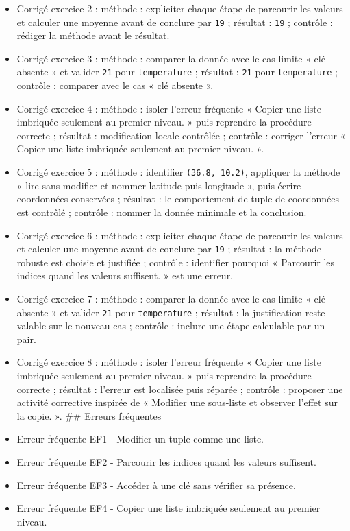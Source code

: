 \begin{itemize}
  appliquer la méthode « lire sans modifier et nommer latitude puis
  longitude », puis écrire coordonnées conservées ; résultat :
  coordonnées conservées ; contrôle : faire apparaître le contrôle «
  tentative de modification interdite ».
\item
  Corrigé exercice 2 : méthode : expliciter chaque étape de parcourir
  les valeurs et calculer une moyenne avant de conclure par \texttt{19}
  ; résultat : \texttt{19} ; contrôle : rédiger la méthode avant le
  résultat.
\item
  Corrigé exercice 3 : méthode : comparer la donnée avec le cas limite «
  clé absente » et valider \texttt{21} pour \texttt{temperature} ;
  résultat : \texttt{21} pour \texttt{temperature} ; contrôle : comparer
  avec le cas « clé absente ».
\item
  Corrigé exercice 4 : méthode : isoler l'erreur fréquente « Copier une
  liste imbriquée seulement au premier niveau. » puis reprendre la
  procédure correcte ; résultat : modification locale contrôlée ;
  contrôle : corriger l'erreur « Copier une liste imbriquée seulement au
  premier niveau. ».
\item
  Corrigé exercice 5 : méthode : identifier \texttt{(36.8,\ 10.2)},
  appliquer la méthode « lire sans modifier et nommer latitude puis
  longitude », puis écrire coordonnées conservées ; résultat : le
  comportement de tuple de coordonnées est contrôlé ; contrôle : nommer
  la donnée minimale et la conclusion.
\item
  Corrigé exercice 6 : méthode : expliciter chaque étape de parcourir
  les valeurs et calculer une moyenne avant de conclure par \texttt{19}
  ; résultat : la méthode robuste est choisie et justifiée ; contrôle :
  identifier pourquoi « Parcourir les indices quand les valeurs
  suffisent. » est une erreur.
\item
  Corrigé exercice 7 : méthode : comparer la donnée avec le cas limite «
  clé absente » et valider \texttt{21} pour \texttt{temperature} ;
  résultat : la justification reste valable sur le nouveau cas ;
  contrôle : inclure une étape calculable par un pair.
\item
  Corrigé exercice 8 : méthode : isoler l'erreur fréquente « Copier une
  liste imbriquée seulement au premier niveau. » puis reprendre la
  procédure correcte ; résultat : l'erreur est localisée puis réparée ;
  contrôle : proposer une activité corrective inspirée de « Modifier une
  sous-liste et observer l'effet sur la copie. ». \#\# Erreurs
  fréquentes
\item
  Erreur fréquente EF1 - Modifier un tuple comme une liste.
\item
  Erreur fréquente EF2 - Parcourir les indices quand les valeurs
  suffisent.
\item
  Erreur fréquente EF3 - Accéder à une clé sans vérifier sa présence.
\item
  Erreur fréquente EF4 - Copier une liste imbriquée seulement au premier
  niveau.
\end{itemize}

